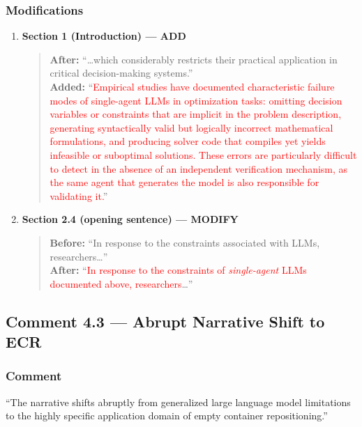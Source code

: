 \documentclass[11pt,a4paper]{article}
\begin{document}
\subsubsection{Modifications}
\begin{enumerate}
\item \textbf{Section 1 (Introduction) --- ADD}
\begin{quote}
\textbf{After:} ``\ldots which considerably restricts their practical application in critical decision-making systems.''\\[4pt]
\textbf{Added:} ``\textcolor{red}{Empirical studies have documented characteristic failure modes of single-agent LLMs in optimization tasks: omitting decision variables or constraints that are implicit in the problem description, generating syntactically valid but logically incorrect mathematical formulations, and producing solver code that compiles yet yields infeasible or suboptimal solutions. These errors are particularly difficult to detect in the absence of an independent verification mechanism, as the same agent that generates the model is also responsible for validating it.}''
\end{quote}
\item \textbf{Section 2.4 (opening sentence) --- MODIFY}
\begin{quote}
\textbf{Before:} ``In response to the constraints associated with LLMs, researchers\ldots''\\[4pt]
\textbf{After:} ``\textcolor{red}{In response to the constraints of \emph{single-agent} LLMs documented above, researchers}\ldots''
\end{quote}
\end{enumerate}

\subsection{Comment 4.3 --- Abrupt Narrative Shift to ECR}

\subsubsection{Comment}
``The narrative shifts abruptly from generalized large language model limitations to the highly specific application domain of empty container repositioning.''
\end{document}
